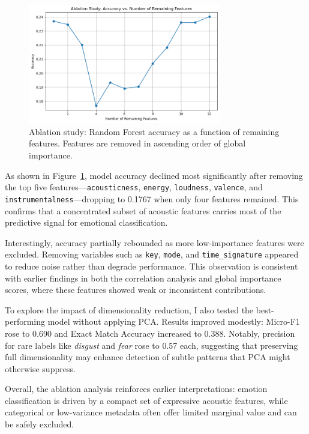 \documentclass{article}
\begin{document}
\begin{figure}[H]
\centering
\includegraphics[width=0.75\textwidth]{Graphics/Ablation Study.png}
\caption{Ablation study: Random Forest accuracy as a function of remaining features. Features are removed in ascending order of global importance.}
\label{fig:ablation_study}
\end{figure}

As shown in Figure~\ref{fig:ablation_study}, model accuracy declined most significantly after removing the top five features—\texttt{acousticness}, \texttt{energy}, \texttt{loudness}, \texttt{valence}, and \texttt{instrumentalness}—dropping to 0.1767 when only four features remained. This confirms that a concentrated subset of acoustic features carries most of the predictive signal for emotional classification.

Interestingly, accuracy partially rebounded as more low-importance features were excluded. Removing variables such as \texttt{key}, \texttt{mode}, and \texttt{time\_signature} appeared to reduce noise rather than degrade performance. This observation is consistent with earlier findings in both the correlation analysis and global importance scores, where these features showed weak or inconsistent contributions.

To explore the impact of dimensionality reduction, I also tested the best-performing model without applying PCA. Results improved modestly: Micro-F1 rose to 0.690 and Exact Match Accuracy increased to 0.388. Notably, precision for rare labels like \textit{disgust} and \textit{fear} rose to 0.57 each, suggesting that preserving full dimensionality may enhance detection of subtle patterns that PCA might otherwise suppress.

Overall, the ablation analysis reinforces earlier interpretations: emotion classification is driven by a compact set of expressive acoustic features, while categorical or low-variance metadata often offer limited marginal value and can be safely excluded.
\end{document}
